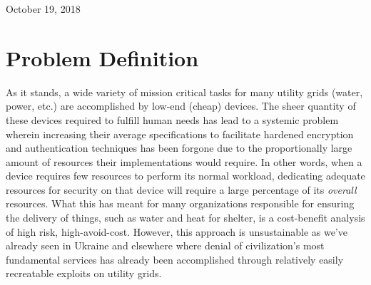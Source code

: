 \documentclass[a4paper,titlepage]{article}
\begin{document}
\begin{titlepage}

{\large October 19, 2018}\\[3cm] %




\vfill %

\end{titlepage}


\section{Problem Definition}

As it stands, a wide variety of mission critical tasks for many utility grids (water, power, etc.) are accomplished by low-end (cheap) devices. The sheer quantity of these devices required to fulfill human needs has lead to a systemic problem wherein increasing their average specifications to facilitate hardened encryption and authentication techniques has been forgone due to the proportionally large amount of resources their implementations would require. In other words, when a device requires few resources to perform its normal workload, dedicating adequate resources for security on that device will require a large percentage of its \textit{overall} resources. What this has meant for many organizations responsible for ensuring the delivery of things, such as water and heat for shelter, is a cost-benefit analysis of high risk, high-avoid-cost. However, this approach is unsustainable as we've already seen in Ukraine and elsewhere where denial of civilization's most fundamental services has already been accomplished through relatively easily recreatable \cite{Numbah2}exploits on utility grids.
\end{document}
